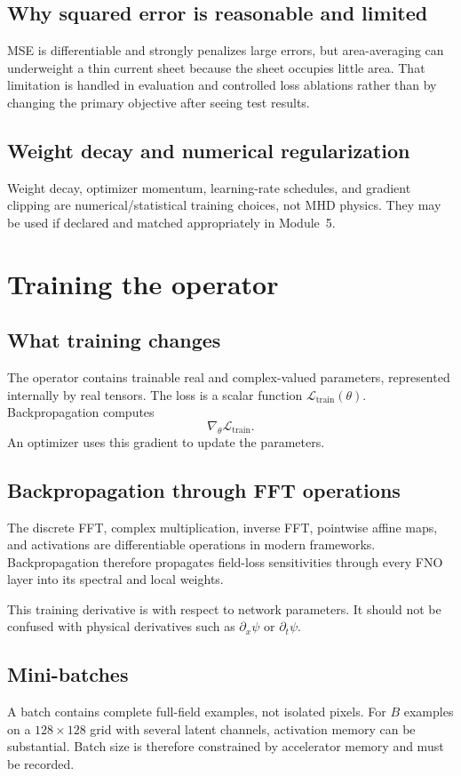 \documentclass[11pt]{article}
\newcommand{\Ltrain}{\mathcal{L}_{\mathrm{train}}}
\begin{document}
\subsection{Why squared error is reasonable and limited}
MSE is differentiable and strongly penalizes large errors, but area-averaging can underweight a thin current sheet because the sheet occupies little area. That limitation is handled in evaluation and controlled loss ablations rather than by changing the primary objective after seeing test results.

\subsection{Weight decay and numerical regularization}
Weight decay, optimizer momentum, learning-rate schedules, and gradient clipping are numerical/statistical training choices, not MHD physics. They may be used if declared and matched appropriately in Module~5.

\section{Training the operator}
\label{sec:training}

\subsection{What training changes}
The operator contains trainable real and complex-valued parameters, represented internally by real tensors. The loss is a scalar function $\Ltrain(\theta)$. Backpropagation computes
\[
\nabla_\theta\Ltrain.
\]
An optimizer uses this gradient to update the parameters.

\subsection{Backpropagation through FFT operations}
The discrete FFT, complex multiplication, inverse FFT, pointwise affine maps, and activations are differentiable operations in modern frameworks. Backpropagation therefore propagates field-loss sensitivities through every FNO layer into its spectral and local weights.

This training derivative is with respect to network parameters. It should not be confused with physical derivatives such as $\partial_x\psi$ or $\partial_t\psi$.

\subsection{Mini-batches}
A batch contains complete full-field examples, not isolated pixels. For $B$ examples on a $128\times128$ grid with several latent channels, activation memory can be substantial. Batch size is therefore constrained by accelerator memory and must be recorded.
\end{document}
